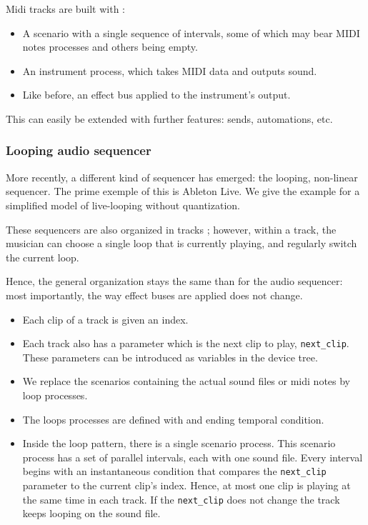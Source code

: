 \documentclass[applsci,article,submit,moreauthors,pdftex,10pt,a4paper]{mdpi}
\begin{document}
Midi tracks are built with : 
\begin{itemize}
    \item A scenario with a single sequence of intervals, some of which may bear MIDI notes processes and others being empty.
    \item An instrument process, which takes MIDI data and outputs sound.
    \item Like before, an effect bus applied to the instrument's output.
\end{itemize}

This can easily be extended with further features: sends, automations, etc.
\subsubsection{Looping audio sequencer}
More recently, a different kind of sequencer has emerged: the looping, non-linear sequencer. 
The prime exemple of this is Ableton Live. We give the example for a simplified model of live-looping without quantization.

These sequencers are also organized in tracks ; however, within a track, the musician can choose a single loop 
that is currently playing, and regularly switch the current loop.

Hence, the general organization stays the same than for the audio sequencer: most importantly, the way effect buses are applied does not change.

\begin{itemize}
    \item Each clip of a track is given an index. 
    \item Each track also has a parameter which is the next clip to play, \lstinline|next_clip|. These parameters can be introduced as variables in the device tree.
    \item We replace the scenarios containing the actual sound files or midi notes by loop processes. 
    \item The loops processes are defined with and ending temporal condition. 
    \item Inside the loop pattern, there is a single scenario process. This scenario process has a set of parallel intervals, each with one sound file. Every interval begins with an instantaneous condition that compares the \lstinline|next_clip| parameter to the current clip's index. Hence, at most one clip is playing at the same time in each track. If the \lstinline|next_clip| does not change the track keeps looping on the sound file.
\end{itemize}
\end{document}
